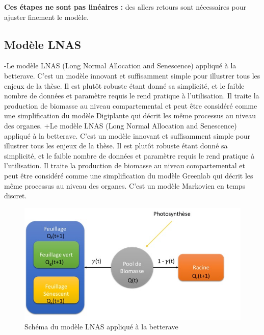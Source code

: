 \textbf{Ces étapes ne sont pas linéaires :} des allers retours sont nécessaires pour ajuster finement le modèle.


 \subsection{Modèle LNAS}
 
-Le modèle LNAS (Long Normal Allocation and Senescence) appliqué à la betterave. C’est un modèle innovant et suffisamment simple pour illustrer tous les enjeux de la thèse. Il est plutôt robuste étant donné sa simplicité, et le faible nombre de données et paramètre requis le rend pratique à l’utilisation. Il traite la production de biomasse au niveau compartemental et peut être considéré comme une simplification du modèle Digiplante qui décrit les même processus au niveau des organes.
+Le modèle LNAS (Long Normal Allocation and Senescence) appliqué à la betterave. C’est un modèle innovant et suffisamment simple pour illustrer tous les enjeux de la thèse. Il est plutôt robuste étant donné sa simplicité, et le faible nombre de données et paramètre requis le rend pratique à l’utilisation. Il traite la production de biomasse au niveau compartemental et peut être considéré comme une simplification du modèle Greenlab qui décrit les même processus au niveau des organes.
 C’est un modèle Markovien en temps discret.
 
 \begin{figure}[h]
 	\begin{center}
 	
 	
   \includegraphics[scale=1.0]{./img/sBeetRoot.jpg}
   \caption{Schéma du modèle LNAS appliqué à la betterave}
   \label{fig:sBeetRoot}
   
   \end{center}
 \end{figure}
 
